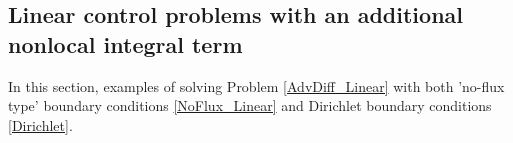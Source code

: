 %
%
%
%


\subsection{Linear control problems with an additional nonlocal integral term}
In this section, examples of solving Problem \eqref{AdvDiff_Linear} with both 'no-flux type' boundary conditions \eqref{NoFlux_Linear} and Dirichlet boundary conditions \eqref{Dirichlet}.
